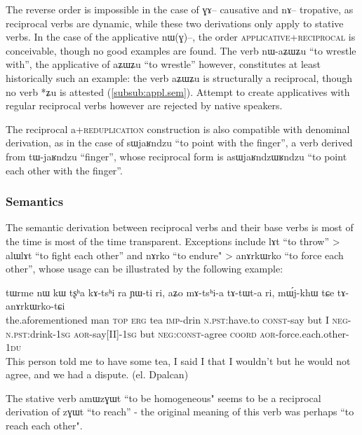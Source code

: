 \documentclass[oldfontcommands,oneside,a4paper,11pt]{memoir}
\newcommand{\ipa}[1]{{\phon #1}} %
\newcommand{\aor}{\textsc{aor}}
\newcommand{\coord}{\textsc{coord}}
\newcommand{\const}{\textsc{const}}
\newcommand{\du}{\textsc{du}}
\newcommand{\erg}{\textsc{erg}}
\newcommand{\imp}{\textsc{imp}}
\newcommand{\negat}{\textsc{neg}}
\newcommand{\npst}{\textsc{n.pst}}
\newcommand{\sg}{\textsc{sg}}
\newcommand{\topic}{\textsc{top}}
\begin{document}
The reverse order is impossible in the case of \ipa{ɣɤ}-- causative and \ipa{nɤ}-- tropative, as reciprocal verbs are dynamic, while these two derivations only apply to stative verbs. In the case of the applicative \ipa{nɯ(ɣ)}--, the order \textsc{applicative}+\textsc{reciprocal} is conceivable, though no good examples are found. The verb \ipa{nɯ-aʑɯʑu} ``to wrestle with'', the applicative of \ipa{aʑɯʑu} ``to wrestle'' however, constitutes at least historically such an example: the verb  \ipa{aʑɯʑu} is structurally a reciprocal, though no verb *ʑu is attested (\ref{subsub:appl.sem}). Attempt to create applicatives with regular reciprocal verbs however are rejected by native speakers.

The reciprocal \ipa{a}+\textsc{reduplication} construction is also compatible with denominal derivation, as in the case of \ipa{sɯjaʁndzu} ``to point with the finger'', a verb derived from \ipa{tɯ-jaʁndzu} ``finger'', whose reciprocal form is  \ipa{asɯjaʁndzɯʁndzu} ``to point each other with the finger''.
 

\subsubsection{Semantics}
The semantic derivation between reciprocal verbs and their base verbs is most of the time is most of the time transparent. Exceptions include  \ipa{lɤt} ``to throw'' > \ipa{alɯlɤt} ``to fight each other'' and \ipa{nɤrko} ``to endure" > \ipa{anɤrkɯrko} ``to force each other'', whose usage can be illustrated by the following example:


   \begin{exe}
\ex
\gll    \ipa{iɕqʰa} 	\ipa{tɯrme} 	\ipa{nɯ} 	\ipa{kɯ} 	  	\ipa{tʂʰa} \ipa{kɤ-tsʰi} \ipa{ra} 	\ipa{ɲɯ-ti} 	\ipa{ri,} 	\ipa{aʑo} 	\ipa{mɤ-tsʰi-a} 	\ipa{tɤ-tɯt-a} 	\ipa{ri,} 	\ipa{mɯ́j-khɯ} 	\ipa{tɕe} 	\ipa{tɤ-anɤrkɯrko-tɕi}   \\
the.aforementioned man \topic{} \erg{}  tea \imp{}-drin \npst{}:have.to \const{}-say but I  \negat{}-\npst{}:drink-1\sg{} \aor{}-say[II]-1\sg{} but \negat{}:\const{}-agree \coord{} \aor{}-force.each.other-1\du{}   \\
 \glt   This person told me to have some tea, I said I that I wouldn't but he would not agree, and we had a dispute. (el. Dpalcan)
 
\end{exe} 

The stative verb \ipa{amɯzɣɯt} ``to be homogeneous" seems to be a reciprocal derivation of \ipa{zɣɯt} ``to reach'' - the original meaning of this verb was perhaps ``to reach each other".
\end{document}
